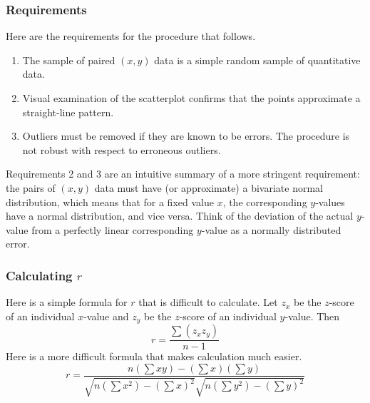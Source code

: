 \documentclass[xcolor=dvipsnames]{beamer}
\begin{document}
\begin{frame}
  \frametitle{Requirements}
  Here are the requirements for the procedure that follows.
  \begin{enumerate}
  \item The sample of paired $(x,y)$ data is a simple random sample of
    quantitative data.
  \item Visual examination of the scatterplot confirms that the points
    approximate a straight-line pattern.
  \item Outliers must be removed if they are known to be errors. The
    procedure is not robust with respect to erroneous outliers.
  \end{enumerate}
  Requirements 2 and 3 are an intuitive summary of a more stringent
  requirement: the pairs of $(x,y)$ data must have (or approximate) a
  \alert{bivariate normal distribution}, which means that for a fixed
  value $x$, the corresponding $y$-values have a normal distribution,
  and vice versa. Think of the deviation of the actual $y$-value from
  a perfectly linear corresponding $y$-value as a normally distributed
  error.
\end{frame}

\begin{frame}
  \frametitle{Calculating $r$}
  Here is a simple formula for $r$ that is difficult to calculate. Let
  $z_{x}$ be the $z$-score of an individual $x$-value and $z_{y}$ be
  the $z$-score of an individual $y$-value. Then
  \begin{equation}
    \label{eq:eegheela}
    r=\frac{\sum{}(z_{x}z_{y})}{n-1}
  \end{equation}
  Here is a more difficult formula that makes calculation much easier.
  \begin{equation}
    \label{eq:jeithoob}
    r=\frac{n\left(\sum{}xy\right)-\left(\sum{}x\right)\left(\sum{}y\right)}{\sqrt{n\left(\sum{}x^{2}\right)-\left(\sum{}x\right)^{2}}\sqrt{n\left(\sum{}y^{2}\right)-\left(\sum{}y\right)^{2}}}
  \end{equation}
\end{frame}
\end{document}
